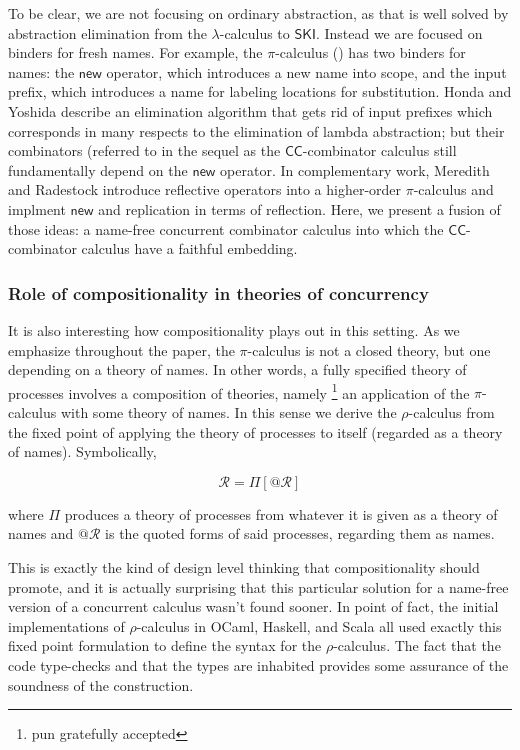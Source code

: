 \documentclass[submission,copyright,creativecommons]{eptcs}
\makeatletter
\newcommand{\new}{\mathsf{new}}
\newcommand{\pic}{$\pi$-calculus}
\newcommand{\ccomb}{$\mathsf{CC}$-combinator calculus}
\newcommand{\quotep}[1]{\mathsf{@}#1}
\newcommand{\rhoc}{$\rho$-calculus}
\theoremstyle{definition}
\theoremstyle{remark}
\theoremstyle{remark}
\makeatother
\begin{document}
To be clear, we are not focusing on ordinary abstraction, as that is
well solved by abstraction elimination from the $\lambda$-calculus to
$\mathsf{SKI}$. Instead we are focused on binders for fresh names. For
example, the {\pic} (\cite{milner91polyadicpi}) has two binders for
names: the $\new$ operator, which introduces a new name into scope,
and the input prefix, which introduces a name for labeling locations
for substitution.  Honda and Yoshida \cite{DBLP:conf/popl/HondaY94}
\cite{DBLP:journals/tcs/Yoshida02} describe an elimination algorithm
that gets rid of input prefixes which corresponds in many respects to
the elimination of lambda abstraction; but their combinators (referred
to in the sequel as the {\ccomb} still fundamentally depend on the
$\new$ operator.  In complementary work, Meredith and Radestock
\cite{DBLP:journals/entcs/MeredithR05} introduce reflective operators
into a higher-order {\pic} and implment $\new$ and replication in
terms of reflection.  Here, we present a fusion of those ideas: a
name-free concurrent combinator calculus into which the {\ccomb} have
a faithful embedding.

\subsubsection{Role of compositionality in theories of concurrency} 
It is also interesting how compositionality plays out in this
setting. As we emphasize throughout the paper, the {\pic\;} is not a
closed theory, but one depending on a theory of names. In other words,
a fully specified theory of processes involves a composition of
theories, namely \footnote{pun gratefully accepted} an application of
the {\pic\;} with some theory of names. In this sense we derive the
{\rhoc} \cite{DBLP:journals/entcs/MeredithR05} from the fixed point of
applying the theory of processes to itself (regarded as a theory of
names). Symbolically,

\begin{equation*}
  \mathcal{R} = \Pi[\quotep{\mathcal{R}}]
\end{equation*}

where $\Pi$ produces a theory of processes from whatever it is given
as a theory of names and $\quotep{\mathcal{R}}$ is the quoted forms of
said processes, regarding them as names.

This is exactly the kind of design level thinking that
compositionality should promote, and it is actually surprising that
this particular solution for a name-free version of a concurrent
calculus wasn't found sooner. In point of fact, the initial
implementations of {\rhoc} in \textsf{OCaml}, \textsf{Haskell}, and
\textsf{Scala} all used exactly this fixed point formulation to define the
syntax for the {\rhoc}. The fact that the code type-checks
and that the types are inhabited provides some assurance of the
soundness of the construction.
\end{document}
